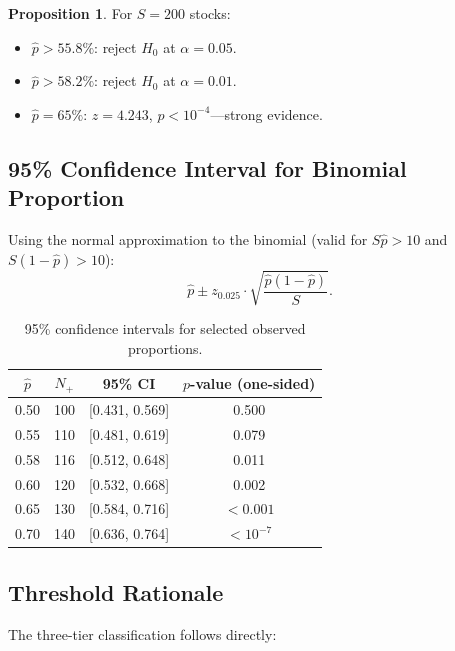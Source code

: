 \documentclass[11pt,a4paper]{article}
\theoremstyle{definition}
\newtheorem{proposition}{Proposition}[section]
\newcommand{\Ho}{H_{0}}
\begin{document}
\begin{proposition}
    For $S = 200$ stocks:
    \begin{itemize}
        \item $\hat{p} > 55.8\%$: reject $\Ho$ at $\alpha = 0.05$.
        \item $\hat{p} > 58.2\%$: reject $\Ho$ at $\alpha = 0.01$.
        \item $\hat{p} = 65\%$: $z = 4.243$, $p < 10^{-4}$---strong evidence.
    \end{itemize}
\end{proposition}

\subsection{95\% Confidence Interval for Binomial Proportion}

Using the normal approximation to the binomial (valid for $S\hat{p} > 10$ and
$S(1-\hat{p}) > 10$):
\begin{equation}
    \hat{p} \pm z_{0.025} \cdot \sqrt{\frac{\hat{p}(1-\hat{p})}{S}}.
    \label{eq:binom_ci}
\end{equation}

\begin{table}[htbp]
\centering
\caption{95\% confidence intervals for selected observed proportions.}
\label{tab:binom_ci}
\begin{tabular}{cccc}
\toprule
$\hat{p}$ & $N_{+}$ & 95\% CI & $p$-value (one-sided) \\
\midrule
0.50 & 100 & [0.431, 0.569] & 0.500 \\
0.55 & 110 & [0.481, 0.619] & 0.079 \\
0.58 & 116 & [0.512, 0.648] & 0.011 \\
0.60 & 120 & [0.532, 0.668] & 0.002 \\
0.65 & 130 & [0.584, 0.716] & $< 0.001$ \\
0.70 & 140 & [0.636, 0.764] & $< 10^{-7}$ \\
\bottomrule
\end{tabular}
\end{table}

\subsection{Threshold Rationale}

The three-tier classification follows directly:
\end{document}
